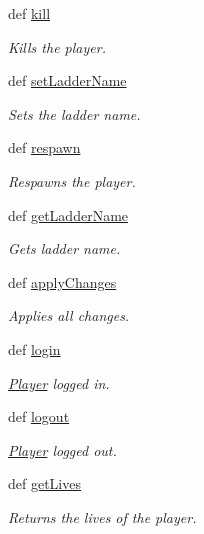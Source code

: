 \begin{DoxyCompactItemize}
def \hyperlink{class_player_1_1_player_a0c11f5c7d81c7ba9dab3c42d2aec99b5}{kill}
\begin{DoxyCompactList}\small\item\em \-Kills the player. \end{DoxyCompactList}\item 
def \hyperlink{class_player_1_1_player_a3fe69a625c1b8d2cb1566c9b9dae716b}{set\-Ladder\-Name}
\begin{DoxyCompactList}\small\item\em \-Sets the ladder name. \end{DoxyCompactList}\item 
def \hyperlink{class_player_1_1_player_a893ceeec823eb76e308740259ce44b84}{respawn}
\begin{DoxyCompactList}\small\item\em \-Respawns the player. \end{DoxyCompactList}\item 
def \hyperlink{class_player_1_1_player_a09db947ac51035a778b60fbb60589140}{get\-Ladder\-Name}
\begin{DoxyCompactList}\small\item\em \-Gets ladder name. \end{DoxyCompactList}\item 
def \hyperlink{class_player_1_1_player_a2061e23c4e3cd01c36af8e4fc10fa2e4}{apply\-Changes}
\begin{DoxyCompactList}\small\item\em \-Applies all changes. \end{DoxyCompactList}\item 
def \hyperlink{class_player_1_1_player_aecce94db442e270a625bbdad73d9556c}{login}
\begin{DoxyCompactList}\small\item\em \hyperlink{class_player_1_1_player}{\-Player} logged in. \end{DoxyCompactList}\item 
def \hyperlink{class_player_1_1_player_a3f7353e24ad37c9cfed8be50eaba9f72}{logout}
\begin{DoxyCompactList}\small\item\em \hyperlink{class_player_1_1_player}{\-Player} logged out. \end{DoxyCompactList}\item 
def \hyperlink{class_player_1_1_player_a55a38766a5aff1b01faa814435253e88}{get\-Lives}
\begin{DoxyCompactList}\small\item\em \-Returns the lives of the player. \end{DoxyCompactList}\item 

\end{DoxyCompactItemize}
